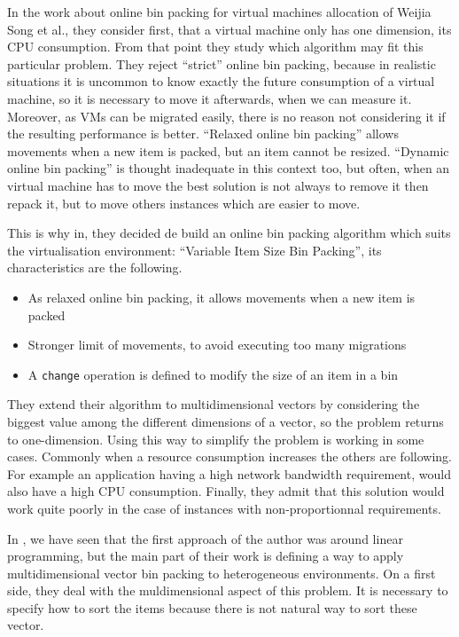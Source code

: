 \documentclass[a4paper,11pt]{article}
\begin{document}
In the work about online bin packing for virtual machines allocation of Weijia
Song et al.\cite{reassignment:visbp}, they consider first, that a virtual
machine only has one dimension, its CPU consumption. From that point they study
which algorithm may fit this particular problem. They reject “strict” online
bin packing, because in realistic situations it is uncommon to know exactly
the future consumption of a virtual machine, so it is necessary to move it
afterwards, when we can measure it. Moreover, as VMs can be migrated easily,
there is no reason not considering it if the resulting performance is better.
“Relaxed online bin packing” allows movements when a new item is packed, but
an item cannot be resized. “Dynamic online bin packing” is thought inadequate
in this context too, but often, when an virtual machine has to move the best
solution is not always to remove it then repack it, but to move others instances
which are easier to move.

This is why in\cite{reassignment:visbp}, they decided de build an online bin
packing algorithm which suits the virtualisation environment: “Variable Item
Size Bin Packing”, its characteristics are the following.

\begin{itemize}
	\item{As relaxed online bin packing, it allows movements when a new item is packed}
	\item{Stronger limit of movements, to avoid executing too many migrations}
	\item{A \texttt{change} operation is defined to modify the size of an item in a bin}
\end{itemize}

They extend their algorithm to multidimensional vectors by considering the biggest
value among the different dimensions of a vector, so the problem returns to
one-dimension. Using this way to simplify the problem is working in some cases.
Commonly when a resource consumption increases the others are following. For
example an application having a high network bandwidth requirement, would also have a
high CPU consumption. Finally, they admit that this solution would work quite poorly
in the case of instances with non-proportionnal requirements.

In \cite{allocation:heterogeneous}, we have seen that the first approach of the author
was around linear programming, but the main part of their work is defining a way
to apply multidimensional vector bin packing to heterogeneous environments. On a first side,
they deal with the muldimensional aspect of this problem. It is necessary to specify how to
sort the items because there is not natural way to sort these vector.
\end{document}
